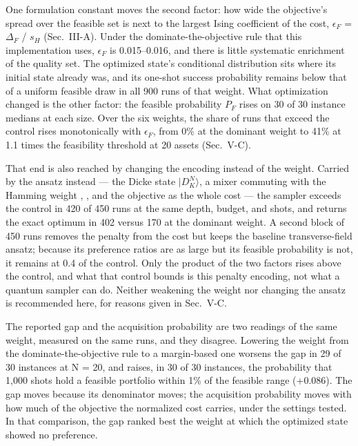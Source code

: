 \documentclass{ieeeaccess}
\begin{document}
One formulation constant moves the second factor: how wide the objective's spread over the feasible set is next to the largest Ising coefficient of the cost, $\epsilon_{F}$ = $\Delta_{F}$ / $s_{H}$ (Sec.~III-A). Under the dominate-the-objective rule that this implementation uses, $\epsilon_{F}$ is 0.015--0.016, and there is little systematic enrichment of the quality set. The optimized state's conditional distribution sits where its initial state already was, and its one-shot success probability remains below that of a uniform feasible draw in all 900 runs of that weight. What optimization changed is the other factor: the feasible probability $P_{F}$ rises on 30 of 30 instance medians at each size. Over the six weights, the share of runs that exceed the control rises monotonically with $\epsilon_{F}$, from 0\% at the dominant weight to 41\% at 1.1 times the feasibility threshold at 20 assets (Sec.~V-C).


That end is also reached by changing the encoding instead of the weight. Carried by the ansatz instead --- the Dicke state $|$$D^{N}_{K}$$\rangle$, a mixer commuting with the Hamming weight \cite{ref11}, \cite{ref12}, and the objective as the whole cost --- the sampler exceeds the control in 420 of 450 runs at the same depth, budget, and shots, and returns the exact optimum in 402 versus 170 at the dominant weight. A second block of 450 runs removes the penalty from the cost but keeps the baseline transverse-field ansatz; because its preference ratios are as large but its feasible probability is not, it remains at 0.4 of the control. Only the product of the two factors rises above the control, and what that control bounds is this penalty encoding, not what a quantum sampler can do. Neither weakening the weight nor changing the ansatz is recommended here, for reasons given in Sec.~V-C.


The reported gap and the acquisition probability are two readings of the same weight, measured on the same runs, and they disagree. Lowering the weight from the dominate-the-objective rule to a margin-based one worsens the gap in 29 of 30 instances at N = 20, and raises, in 30 of 30 instances, the probability that 1,000 shots hold a feasible portfolio within 1\% of the feasible range (+0.086). The gap moves because its denominator moves; the acquisition probability moves with how much of the objective the normalized cost carries, under the settings tested. In that comparison, the gap ranked best the weight at which the optimized state showed no preference.
\end{document}
